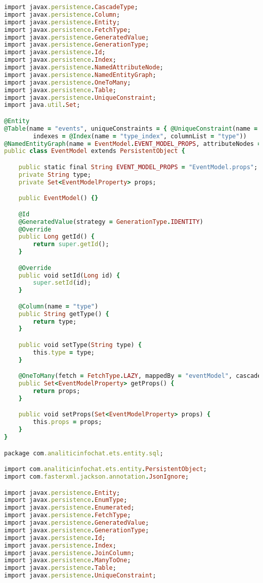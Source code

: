 \begin{lstlisting}[language=Ruby, style=rubystyle]
import javax.persistence.CascadeType;
import javax.persistence.Column;
import javax.persistence.Entity;
import javax.persistence.FetchType;
import javax.persistence.GeneratedValue;
import javax.persistence.GenerationType;
import javax.persistence.Id;
import javax.persistence.Index;
import javax.persistence.NamedAttributeNode;
import javax.persistence.NamedEntityGraph;
import javax.persistence.OneToMany;
import javax.persistence.Table;
import javax.persistence.UniqueConstraint;
import java.util.Set;

@Entity
@Table(name = "events", uniqueConstraints = { @UniqueConstraint(name = "uniq_type", columnNames = "type") },
        indexes = @Index(name = "type_index", columnList = "type"))
@NamedEntityGraph(name = EventModel.EVENT_MODEL_PROPS, attributeNodes = @NamedAttributeNode(value = "props"))
public class EventModel extends PersistentObject {

    public static final String EVENT_MODEL_PROPS = "EventModel.props";
    private String type;
    private Set<EventModelProperty> props;

    public EventModel() {}

    @Id
    @GeneratedValue(strategy = GenerationType.IDENTITY)
    @Override
    public Long getId() {
        return super.getId();
    }

    @Override
    public void setId(Long id) {
        super.setId(id);
    }

    @Column(name = "type")
    public String getType() {
        return type;
    }

    public void setType(String type) {
        this.type = type;
    }

    @OneToMany(fetch = FetchType.LAZY, mappedBy = "eventModel", cascade = CascadeType.ALL)
    public Set<EventModelProperty> getProps() {
        return props;
    }

    public void setProps(Set<EventModelProperty> props) {
        this.props = props;
    }
}

package com.analiticinfochat.ets.entity.sql;

import com.analiticinfochat.ets.entity.PersistentObject;
import com.fasterxml.jackson.annotation.JsonIgnore;

import javax.persistence.Entity;
import javax.persistence.EnumType;
import javax.persistence.Enumerated;
import javax.persistence.FetchType;
import javax.persistence.GeneratedValue;
import javax.persistence.GenerationType;
import javax.persistence.Id;
import javax.persistence.Index;
import javax.persistence.JoinColumn;
import javax.persistence.ManyToOne;
import javax.persistence.Table;
import javax.persistence.UniqueConstraint;


\end{lstlisting}
